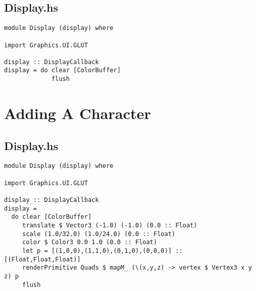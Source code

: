 \documentclass[12pt, a4paper]{report}
\begin{document}
\subsection{Display.hs}
\begin{lstlisting}
module Display (display) where

import Graphics.UI.GLUT

display :: DisplayCallback
display = do clear [ColorBuffer]
             flush
\end{lstlisting}

\section{Adding A Character}
\subsection{Display.hs}
\begin{lstlisting}
module Display (display) where

import Graphics.UI.GLUT

display :: DisplayCallback
display =
  do clear [ColorBuffer]
     translate $ Vector3 (-1.0) (-1.0) (0.0 :: Float)
     scale (1.0/32.0) (1.0/24.0) (0.0 :: Float)
     color $ Color3 0.0 1.0 (0.0 :: Float)
     let p = [(1,0,0),(1,1,0),(0,1,0),(0,0,0)] :: [(Float,Float,Float)]
     renderPrimitive Quads $ mapM_ (\(x,y,z) -> vertex $ Vertex3 x y z) p
     flush
\end{lstlisting}
\end{document}
